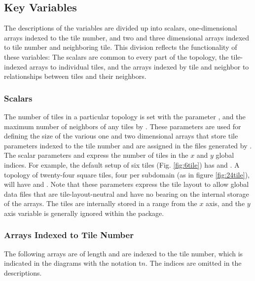 \subsection{Key Variables}

The descriptions of the variables are divided up into scalars,
one-dimensional arrays indexed to the tile number, and two and three
dimensional arrays indexed to tile number and neighboring tile.  This
division reflects the functionality of these variables: The
scalars are common to every part of the topology, the tile-indexed
arrays to individual tiles, and the arrays indexed by tile and
neighbor to relationships between tiles and their neighbors. \\

\subsubsection{Scalars}

The number of tiles in a particular topology is set with the parameter
, and the maximum number of neighbors of any tiles by
.  These parameters are used for defining the
size of the various one and two dimensional arrays that store tile
parameters indexed to the tile number and are assigned in the files
generated by .\\

The scalar parameters 
and  express the number
of tiles in the $x$ and $y$ global indices.  For example, the default
setup of six tiles (Fig. \ref{fig:6tile}) has
 and .  A
topology of twenty-four square tiles, four per subdomain (as in figure
\ref{fig:24tile}), will have  and
.  Note that these parameters express the
tile layout to allow global data files that are tile-layout-neutral
and have no bearing on the internal storage of the arrays.  The tiles
are internally stored in a range from  the
$x$ axis, and the $y$ axis variable  is generally
ignored within the package. \\

\subsubsection{Arrays Indexed to Tile Number}

The following arrays are of length and are indexed to the
tile number, which is indicated in the diagrams with the notation
\textsf{t}$n$.  The indices are omitted in the descriptions. \\

